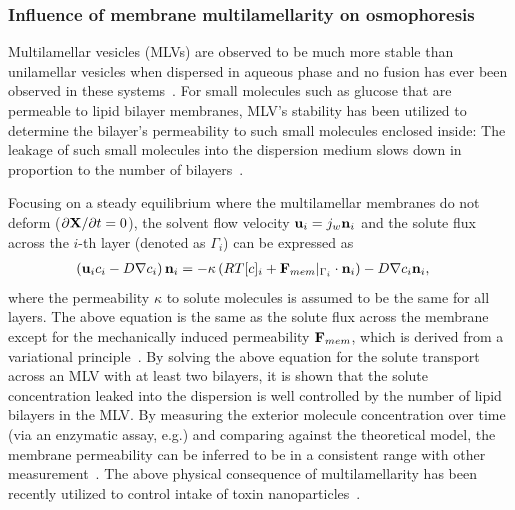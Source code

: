 \documentclass[11pt]{article}
\begin{document}
\subsubsection{Influence of membrane multilamellarity on osmophoresis
\label{subsubsec:Influence_membrane_multilamellarity}}
Multilamellar vesicles (MLVs) are observed to be much more stable than
unilamellar vesicles when dispersed in aqueous phase and no fusion has
ever been observed in these systems~\cite{Lasic1988_BiochemJ}.  For
small molecules such as glucose that are permeable to lipid bilayer
membranes, MLV's stability has been utilized to determine the bilayer's
permeability to such small molecules enclosed inside: The leakage of
such small molecules into the dispersion medium slows down in proportion
to the number of bilayers~\cite{Faure2006_BJ}.

Focusing on a steady equilibrium where the multilamellar membranes do
not deform ($\partial {\bf X}/\partial t=0$), the solvent flow velocity
${\bf u}_i = j_w {\bf n}_i$ and the solute flux across the $i$-th layer
(denoted as $\Gamma_i$) can be expressed as
\begin{align}
\label{eq:solute_flux}
\left({\bf u}_i c_i - D\nabla c_i\right){\bf n}_i &= -\kappa \left(RT[c]_i + {\bf F}_{mem}\rvert_{\Gamma_i}\cdot{\bf n}_i\right)-D\nabla c_i {\bf n}_i,
\end{align}
where the permeability $\kappa$ to solute molecules is assumed to be the
same for all layers. The above equation is the same as the solute flux
across the membrane except for the mechanically induced permeability
${\bf F}_{mem}$, which is derived from a variational
principle~\cite{YaoMori2017_JCP}.  By solving the above equation for the
solute transport across an MLV with at least two bilayers, it is shown
that the solute concentration leaked into the dispersion is well
controlled by the number of lipid bilayers in the MLV.  By measuring the
exterior molecule concentration over time (via an enzymatic assay, e.g.)
and comparing against the theoretical model, the membrane permeability
can be inferred to be in a consistent range with other
measurement~\cite{Faure2006_BJ}.  The above physical consequence of
multilamellarity has been recently utilized to control intake of toxin
nanoparticles~\cite{Kerdudo2014_FoodChem}.
\end{document}
